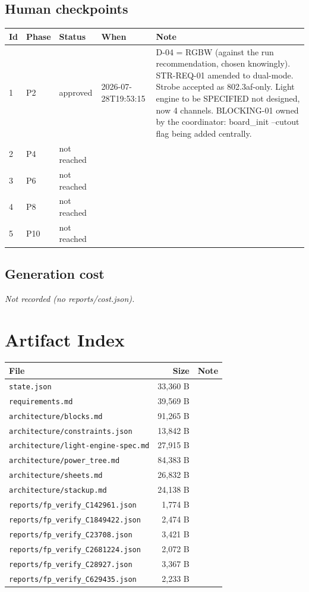 \documentclass[11pt,a4paper]{article}
\begin{document}
\subsection*{Human checkpoints}
{\small
\begin{longtable}{lllp{2.6cm}p{6.4cm}}
\toprule
\textbf{Id} & \textbf{Phase} & \textbf{Status} & \textbf{When} & \textbf{Note} \\
\midrule
\endhead
1 & P2 & approved & 2026-07-28T19:53:15 & D-04 = RGBW (against the run recommendation, chosen knowingly). STR-REQ-01 amended to dual-mode. Strobe accepted as 802.3af-only. Light engine to be SPECIFIED not designed, now 4 channels. BLOCKING-01 owned by the coordinator: board\_init --cutout flag being added centrally. \\
2 & P4 & not reached &  &  \\
3 & P6 & not reached &  &  \\
4 & P8 & not reached &  &  \\
5 & P10 & not reached &  &  \\
\bottomrule
\end{longtable}
}
\subsection*{Generation cost}
\emph{Not recorded (no reports/cost.json).}
\section{Artifact Index}
{\small
\begin{longtable}{p{9cm}rp{4cm}}
\toprule
\textbf{File} & \textbf{Size} & \textbf{Note} \\
\midrule
\endhead
\texttt{state.json} & 33,360 B &  \\
\texttt{requirements.md} & 39,569 B &  \\
\texttt{architecture/blocks.md} & 91,265 B &  \\
\texttt{architecture/constraints.json} & 13,842 B &  \\
\texttt{architecture/light-engine-spec.md} & 27,915 B &  \\
\texttt{architecture/power\_tree.md} & 84,383 B &  \\
\texttt{architecture/sheets.md} & 26,832 B &  \\
\texttt{architecture/stackup.md} & 24,138 B &  \\
\texttt{reports/fp\_verify\_C142961.json} & 1,774 B &  \\
\texttt{reports/fp\_verify\_C1849422.json} & 2,474 B &  \\
\texttt{reports/fp\_verify\_C23708.json} & 3,421 B &  \\
\texttt{reports/fp\_verify\_C2681224.json} & 2,072 B &  \\
\texttt{reports/fp\_verify\_C28927.json} & 3,367 B &  \\
\texttt{reports/fp\_verify\_C629435.json} & 2,233 B &  \\
\bottomrule
\end{longtable}
}
\end{document}
